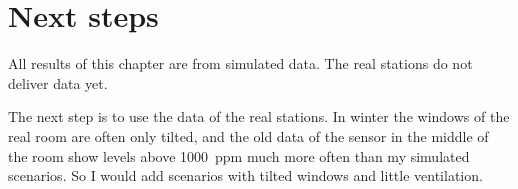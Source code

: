 \section{Next steps}
All results of this chapter are from simulated data. The real stations do not deliver data yet.

The next step is to use the data of the real stations. In winter the windows of the real room are often only tilted,
and the old data of the \cotwo{} sensor in the middle of the room show levels above 1000~ppm much more often than
my simulated scenarios. So I would add scenarios with tilted windows and little ventilation.
